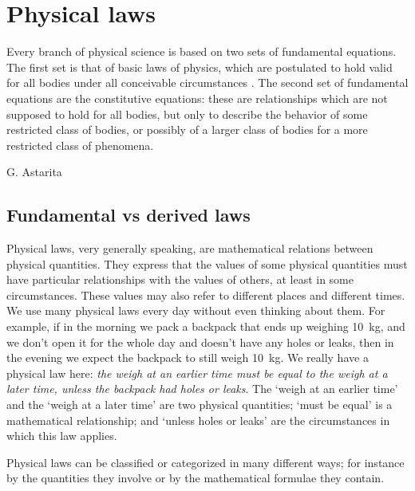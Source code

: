 \documentclass[a4paper,12pt,%
onecolumn,oneside,titlepage,%
british%
]{memoir}
\renewcommand*{\|}[1][]{\nonscript\:#1\vert\nonscript\:\mathopen{}}
\begin{document}
\printpagenotes*
\clearpage
\chapter{Physical laws}
\label{cha:laws}


\epigraph{Every branch of physical science is based on two sets of fundamental equations. The first set is that of basic laws of physics, which are postulated to hold valid for all bodies under all conceivable circumstances \textelp{}. The second set of fundamental equations are the constitutive equations: these are relationships which are not supposed to hold for all bodies, but only to describe the behavior of some restricted class of bodies, or possibly of a larger class of bodies for a more restricted class of phenomena.}{G. Astarita \cites*{astarita1989_r1990}}

\section{Fundamental vs derived laws}
\label{sec:fundamental_derived}

Physical laws, very generally speaking, are mathematical relations between physical quantities. They express that the values of some physical quantities must have particular relationships with the values of others, at least in some circumstances. These values may also refer to different places and different times. We use many physical laws every day without even thinking about them. For example, if in the morning we pack a backpack that ends up weighing \qty{10}{kg}, and we don't open it for the whole day and doesn't have any holes or leaks, then in the evening we expect the backpack to still weigh \qty{10}{kg}. We really have a physical law here: \emph{the weigh at an earlier time must be equal to the weigh at a later time, unless the backpack had holes or leaks}. The \enquote*{weigh at an earlier time} and the \enquote*{weigh at a later time} are two physical quantities; \enquote*{must be equal} is a mathematical relationship; and \enquote*{unless holes or leaks} are the circumstances in which this law applies.

Physical laws can be classified or categorized in many different ways; for instance by the quantities they involve or by the mathematical formulae they contain.
\end{document}
